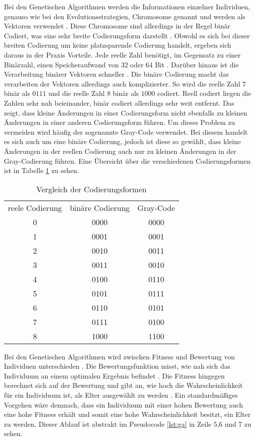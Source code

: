 Bei den Genetischen Algorithmen werden die Informationen einzelner Individuen, genauso wie bei den Evolutionsstrategien, Chromosome genannt und werden als Vektoren verwendet \cite[S.~187-189]{schoeneburg}. Diese Chromosome sind allerdings in der Regel binär Codiert, was eine sehr breite Codierungsform darstellt \cite[S.~191]{schoeneburg}. 
Obwohl es sich bei dieser breiten Codierung um keine platzsparende Codierung handelt, ergeben sich daraus in der Praxis Vorteile. Jede reelle Zahl benötigt, im Gegensatz zu einer Binärzahl, einen Speicheraufwand von 32 oder 64 Bit \cite[S.~191]{schoeneburg}.
Darüber hinaus ist die Verarbeitung binärer Vektoren schneller \cite[S.~191]{schoeneburg}. Die binäre Codierung macht das verarbeiten der Vektoren allerdings auch komplizierter.
So wird die reelle Zahl $7$ binär als $0111$ und die reelle Zahl $8$ binär als $1000$ codiert. Reell codiert liegen die Zahlen sehr nah beieinander, binär codiert allerdings sehr weit entfernt. Das zeigt, dass kleine Änderungen in einer Codierungsform nicht ebenfalls zu kleinen Änderungen in einer anderen Codierungsform führen.
Um dieses Problem zu vermeiden wird häufig der sogenannte Gray-Code verwendet. Bei diesem handelt es sich auch um eine binäre Codierung, jedoch ist diese so gewählt, dass kleine Änderungen in der reellen Codierung auch nur zu kleinen Änderungen in der Gray-Codierung führen. Eine Übersicht über die verschiedenen Codierungsformen ist in Tabelle \ref{tab:codierung} zu sehen.
\begin{table}[!htb]
\centering
\begin{tabular}[h]{c|c|c}
reele Codierung & binäre Codierung & Gray-Code \\
0 & 0000 & 0000 \\
1 & 0001 & 0001 \\
2 & 0010 & 0011 \\
3 & 0011 & 0010 \\
4 & 0100 & 0110 \\
5 & 0101 & 0111 \\
6 & 0110 & 0101 \\
7 & 0111 & 0100 \\
8 & 1000 & 1100 \\
\end{tabular}
\caption[Vergleich der Codierungsformen]{\label{tab:codierung}Vergleich der Codierungsformen \cite[S.~192]{schoeneburg}}
\end{table}

Bei den Genetischen Algorithmen wird zwischen Fitness und Bewertung von Individuen unterschieden \cite[S.~196]{schoeneburg}. Die Bewertungsfunktion misst, wie nah sich das Individuum an einem optimalen Ergebnis befindet \cite[S.~196]{schoeneburg}.
Die Fitness hingegen berechnet sich auf der Bewertung und gibt an, wie hoch die Wahrscheinlichkeit für ein Individuum ist, als Elter ausgewählt zu werden \cite[S.~196]{schoeneburg}. Ein standardmäßiges Vorgehen wäre demnach, dass ein Individuum mit einer hohen Bewertung auch eine hohe Fitness erhält und somit eine hohe Wahrscheinlichkeit besitzt, ein Elter zu werden.
Dieser Ablauf ist abstrakt im Pseudocode \ref{lst:ga} in Zeile 5,6 und 7 zu sehen.

